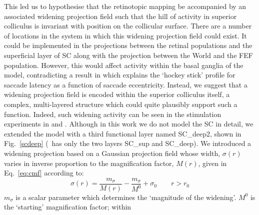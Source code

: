 \documentclass{frontiersSCNS}
\begin{document}
This led us to hypothesise that the retinotopic mapping be accompanied
by an associated widening projection field such that the hill of
activity in superior colliculus is invariant with position on the
collicular surface. There are a number of locations in the system in
which this widening projection field could exist. It could be
implemented in the projections between the retinal populations and the
superficial layer of SC along with the projection between the World
and the FEF population. However, this would affect activity within the
basal ganglia of the model, contradicting a result
in \cite{cope_basal_2017} which explains the `hockey stick' profile
for saccade latency as a function of saccade eccentricity. Instead, we
suggest that a widening projection field is encoded within the
superior colliculus itself, a complex, multi-layered structure which
could quite plausibly support such a function. Indeed, such widening
activity can be seen in the stimulation experiments
in \cite{vokoun_intralaminar_2010} and \cite{vokoun_response_2014}.
%
%
Although in this work we do not model
the SC in detail, we extended the model with a third functional layer
named SC\_deep2, shown in Fig.~\ref{scdeep} (\ccg~has only the two
layers SC\_sup and SC\_deep). We introduced a widening projection
based on a Gaussian projection field whose width, $\sigma(r)$ varies
in inverse proportion to the magnification factor, $M(r)$, given in
Eq.~\ref{eq:cmf} according to:
\begin{equation} \label{eq:sigmar}
\sigma(r) = \frac{m_{\sigma}}{M(r)} - \frac{m_{\sigma}}{M^0} + \sigma_0 \qquad r > r_0
\end{equation}
$m_{\sigma}$ is a scalar parameter which determines the `magnitude of
the widening'. $M^0$ is the `starting' magnification factor; within
\end{document}
